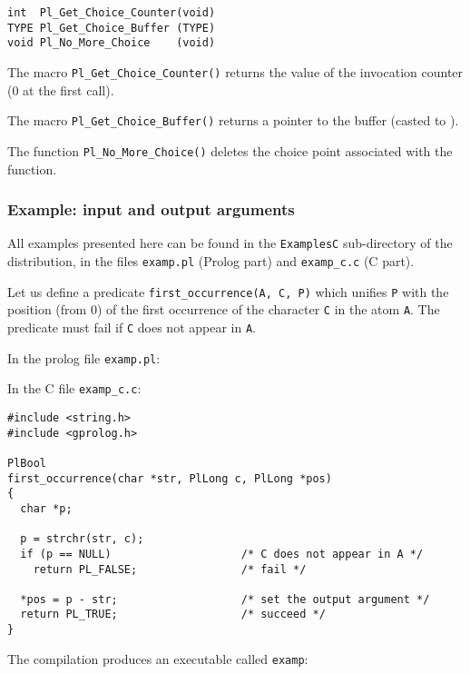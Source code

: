 \begin{Indentation}
\begin{verbatim}
int  Pl_Get_Choice_Counter(void)
TYPE Pl_Get_Choice_Buffer (TYPE)
void Pl_No_More_Choice    (void)
\end{verbatim}
\end{Indentation}

The macro \texttt{Pl\_Get\_Choice\_Counter()} returns the value of the
invocation counter (0 at the first call).

The macro \texttt{Pl\_Get\_Choice\_Buffer()} returns a
pointer to the buffer (casted to ).

The function \texttt{Pl\_No\_More\_Choice()} deletes the choice point
associated with the function.

\subsubsection{Example: input and output arguments}
All examples presented here can be found in the \texttt{ExamplesC}
sub-directory of the distribution, in the files \texttt{examp.pl} (Prolog
part) and \texttt{examp\_c.c} (C part).

Let us define a predicate \texttt{first\_occurrence(A, C, P)} which unifies
\texttt{P} with the position (from 0) of the first occurrence of the
character \texttt{C} in the atom \texttt{A}. The predicate must fail if
\texttt{C} does not appear in \texttt{A}.

In the prolog file \texttt{examp.pl}:


In the C file \texttt{examp\_c.c}:

\begin{Indentation}
\begin{verbatim}
#include <string.h>
#include <gprolog.h>

PlBool
first_occurrence(char *str, PlLong c, PlLong *pos)
{
  char *p;

  p = strchr(str, c);
  if (p == NULL)                    /* C does not appear in A */
    return PL_FALSE;                /* fail */

  *pos = p - str;                   /* set the output argument */
  return PL_TRUE;                   /* succeed */
}
\end{verbatim}
\end{Indentation}

The compilation produces an executable called \texttt{examp}:


